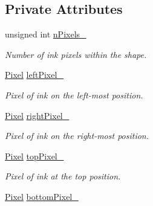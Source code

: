 \subsection*{Private Attributes}
\begin{CompactItemize}
\item 
\hypertarget{class_shape_ec8d5884f4c136898e25922ae978ea65}{
unsigned int \hyperlink{class_shape_ec8d5884f4c136898e25922ae978ea65}{nPixels\_\-}}
\label{class_shape_ec8d5884f4c136898e25922ae978ea65}

\begin{CompactList}\small\item\em Number of ink pixels within the shape. \item\end{CompactList}\item 
\hypertarget{class_shape_812cd080959b320038aae54729831ce4}{
\hyperlink{_pixel_8hpp_535e59456e3e633842529cfa8ea103c4}{Pixel} \hyperlink{class_shape_812cd080959b320038aae54729831ce4}{leftPixel\_\-}}
\label{class_shape_812cd080959b320038aae54729831ce4}

\begin{CompactList}\small\item\em Pixel of ink on the left-most position. \item\end{CompactList}\item 
\hypertarget{class_shape_16adfccce492a7a0e34c5ade941c32fd}{
\hyperlink{_pixel_8hpp_535e59456e3e633842529cfa8ea103c4}{Pixel} \hyperlink{class_shape_16adfccce492a7a0e34c5ade941c32fd}{rightPixel\_\-}}
\label{class_shape_16adfccce492a7a0e34c5ade941c32fd}

\begin{CompactList}\small\item\em Pixel of ink on the right-most position. \item\end{CompactList}\item 
\hypertarget{class_shape_c6755e0dbd9d2eaf537e232fd003c918}{
\hyperlink{_pixel_8hpp_535e59456e3e633842529cfa8ea103c4}{Pixel} \hyperlink{class_shape_c6755e0dbd9d2eaf537e232fd003c918}{topPixel\_\-}}
\label{class_shape_c6755e0dbd9d2eaf537e232fd003c918}

\begin{CompactList}\small\item\em Pixel of ink at the top position. \item\end{CompactList}\item 
\hypertarget{class_shape_8277820de6ff8da989a0659f4e5d82d1}{
\hyperlink{_pixel_8hpp_535e59456e3e633842529cfa8ea103c4}{Pixel} \hyperlink{class_shape_8277820de6ff8da989a0659f4e5d82d1}{bottomPixel\_\-}}
\label{class_shape_8277820de6ff8da989a0659f4e5d82d1}


\end{CompactItemize}

